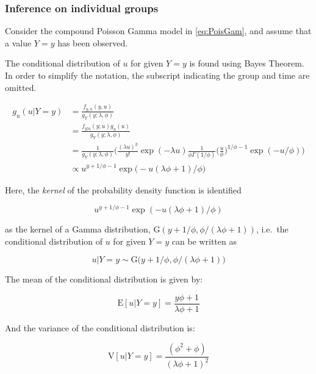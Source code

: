 \documentclass[preprint, 3p, authoryear]{elsarticle} %
\begin{document}
\hypertarget{inference-on-individual-groups}{%
\subsubsection{Inference on individual groups}\label{inference-on-individual-groups}}

Consider the compound Poisson Gamma model in \ref{eq:PoisGam}, and assume that a value \(Y=y\) has been observed.

The conditional distribution of \(u\) for given \(Y=y\) is found using Bayes Theorem. In order to simplify the notation, the subscript indicating the group and time are omitted.

\begin{equation}
  \begin{aligned}
    g_{u}(u|Y=y)&=\frac{f_{y,u}(y,u)}{g_Y(y;\lambda, \phi)} \\
    &=\frac{f_{y|u}(y;u)g_{u}(u)}{g_{Y}(y;\lambda,\phi)} \\
    &=\frac{1}{g_{Y}(y;\lambda,\phi)}\Bigg(\frac{(\lambda u)^y}{y!} \exp (-\lambda u) \frac{1}{\phi \Gamma(1/\phi)} \bigg(\frac{u}{\phi}\bigg)^{1/\phi-1} \exp (-u/\phi)\Bigg) \\
    &\propto u^{y+1/\phi-1} \exp \big(- u(\lambda\phi+1)/\phi\big)
  \end{aligned}
\end{equation}

Here, the \textit{kernel} of the probability density function is identified

\begin{equation}
  u^{y+1/\phi-1} \exp (- u(\lambda\phi+1)/\phi)
\end{equation}

as the kernel of a Gamma distribution, \(\mathrm{G}(y+1/\phi,\phi/(\lambda\phi+1))\), i.e.~the conditional distribution of \(u\) for given \(Y=y\) can be written as

\begin{equation}
  u| Y=y\sim \mathrm{G}\big(y+1/\phi,\phi/(\lambda \phi+1)\big)
\end{equation}

The mean of the conditional distribution is given by:

\begin{equation}
  \mathrm{E}[u|Y=y]=\frac{y\phi+1}{\lambda \phi+1}
\end{equation}

And the variance of the conditional distribution is:

\begin{equation}
  \mathrm{V}[u|Y=y]=\frac{( \phi^2+\phi)}{(\lambda \phi + 1)^2}
\end{equation}
\end{document}
